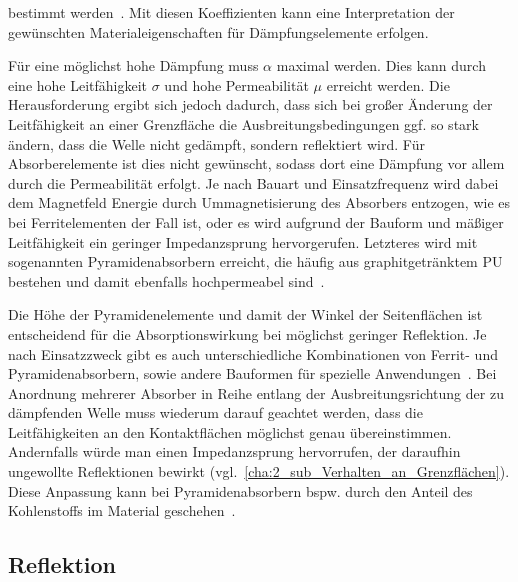 bestimmt werden~\cite{EM_Schirmung}. Mit diesen Koeffizienten kann eine Interpretation der gewünschten Materialeigenschaften für Dämpfungselemente erfolgen. 
\par
\vspace{\linespace}
Für eine möglichst hohe Dämpfung muss $\alpha$ maximal werden. Dies kann durch eine hohe Leitfähigkeit $\sigma$ und hohe Permeabilität $\mu$ erreicht werden. Die Herausforderung ergibt sich jedoch dadurch, dass sich bei großer Änderung der Leitfähigkeit an einer Grenzfläche die Ausbreitungsbedingungen ggf. so stark ändern, dass die Welle nicht gedämpft, sondern reflektiert wird. Für Absorberelemente ist dies nicht gewünscht, sodass dort eine Dämpfung vor allem durch die Permeabilität erfolgt. Je nach Bauart und Einsatzfrequenz wird dabei dem Magnetfeld Energie durch Ummagnetisierung des Absorbers entzogen, wie es bei Ferritelementen der Fall ist, oder es wird aufgrund der Bauform und mäßiger Leitfähigkeit ein geringer Impedanzsprung hervorgerufen. Letzteres wird mit sogenannten Pyramidenabsorbern erreicht, die häufig aus graphitgetränktem \ac{PU} bestehen und damit ebenfalls hochpermeabel sind~\cite{EM_Schirmung}.
\par
\vspace{\linespace}
Die Höhe der Pyramidenelemente und damit der Winkel der Seitenflächen ist entscheidend für die Absorptionswirkung bei möglichst geringer Reflektion. Je nach Einsatzzweck gibt es auch unterschiedliche Kombinationen von Ferrit- und Pyramidenabsorbern, sowie andere Bauformen für spezielle Anwendungen~\cite{EMV-Support_Produktseite, Telemeter_Produktseite}. Bei Anordnung mehrerer Absorber in Reihe entlang der Ausbreitungsrichtung der zu dämpfenden Welle muss wiederum darauf geachtet werden, dass die Leitfähigkeiten an den Kontaktflächen möglichst genau übereinstimmen. Andernfalls würde man einen Impedanzsprung hervorrufen, der daraufhin ungewollte Reflektionen bewirkt (vgl.~\Abschnitt\ref{cha:2_sub_Verhalten_an_Grenzflächen}). Diese Anpassung kann bei Pyramidenabsorbern bspw. durch den Anteil des Kohlenstoffs im Material geschehen~\cite{EM_Schirmung}.




\subsection{Reflektion}\label{cha:2_sub_Reflektion}



